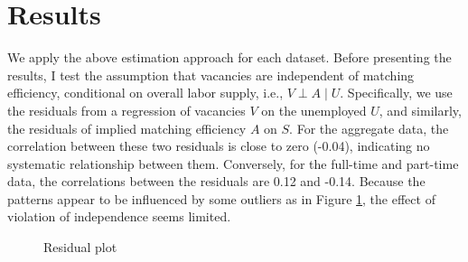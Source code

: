 \documentclass[12pt]{article}
\begin{document}
\section{Results}
We apply the above estimation approach for each dataset.
Before presenting the results, I test the assumption that vacancies are independent of matching efficiency, conditional on overall labor supply, i.e., \( V \perp A \mid U \). 
Specifically, we use the residuals from a regression of vacancies \( V \) on the unemployed \( U \), and similarly, the residuals of implied matching efficiency \( A \) on \( S \).
For the aggregate data, the correlation between these two residuals is close to zero (-0.04), indicating no systematic relationship between them.
Conversely, for the full-time and part-time data, the correlations between the residuals are 0.12 and -0.14.
Because the patterns appear to be influenced by some outliers as in Figure \ref{fg:residual_plots}, the effect of violation of independence seems limited.


\begin{figure}[!ht]
  \begin{center}
  \caption{Residual plot}
  \label{fg:residual_plots} 
  \end{center}
  \footnotesize
\end{figure} 
\end{document}
